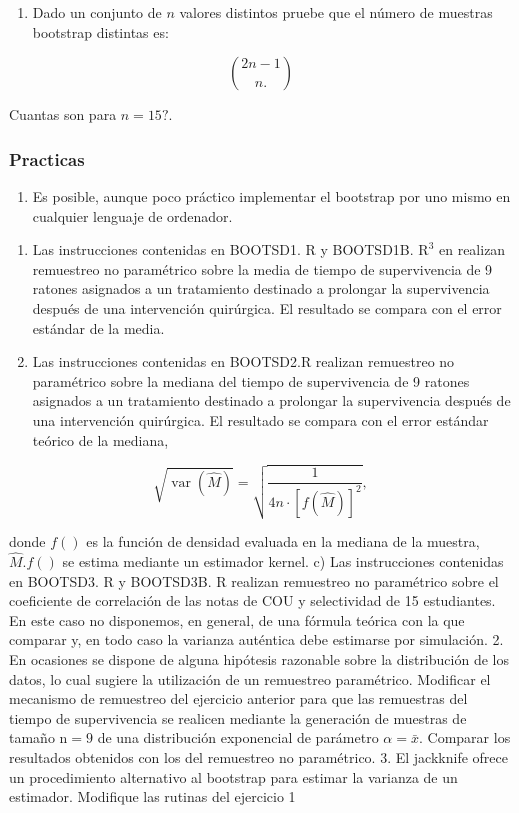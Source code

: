 \documentclass[
]{article}
\providecommand{\tightlist}{%
  \setlength{\itemsep}{0pt}\setlength{\parskip}{0pt}}
\begin{document}
\begin{enumerate}
\def\labelenumi{\arabic{enumi}.}
\setcounter{enumi}{4}
\tightlist
\item
  Dado un conjunto de \(n\) valores distintos pruebe que el número de muestras bootstrap distintas es:
\end{enumerate}

\[
\binom{2 n-1}{n .}
\]

Cuantas son para \(n=15 ?\).

\subsubsection{Practicas}\label{practicas}

\begin{enumerate}
\def\labelenumi{\arabic{enumi}.}
\tightlist
\item
  Es posible, aunque poco práctico implementar el bootstrap por uno mismo en cualquier lenguaje de ordenador.
\end{enumerate}

\begin{enumerate}
\def\labelenumi{\alph{enumi})}
\tightlist
\item
  Las instrucciones contenidas en BOOTSD1. R y BOOTSD1B. \(\mathrm{R}^{3}\) en realizan remuestreo no paramétrico sobre la media de tiempo de supervivencia de 9 ratones asignados a un tratamiento destinado a prolongar la supervivencia después de una intervención quirúrgica. El resultado se compara con el error estándar de la media.
\item
  Las instrucciones contenidas en BOOTSD2.R realizan remuestreo no paramétrico sobre la mediana del tiempo de supervivencia de 9 ratones asignados a un tratamiento destinado a prolongar la supervivencia después de una intervención quirúrgica. El resultado se compara con el error estándar teórico de la mediana,
\end{enumerate}

\[
\sqrt{\operatorname{var}(\widehat{M})}=\sqrt{\frac{1}{4 n \cdot[f(\widehat{M})]^{2}}},
\]

donde \(f()\) es la función de densidad evaluada en la mediana de la muestra, \(\widehat{M} . f()\) se estima mediante un estimador kernel.
c) Las instrucciones contenidas en BOOTSD3. R y BOOTSD3B. R realizan remuestreo no paramétrico sobre el coeficiente de correlación de las notas de COU y selectividad de 15 estudiantes. En este caso no disponemos, en general, de una fórmula teórica con la que comparar y, en todo caso la varianza auténtica debe estimarse por simulación.
2. En ocasiones se dispone de alguna hipótesis razonable sobre la distribución de los datos, lo cual sugiere la utilización de un remuestreo paramétrico. Modificar el mecanismo de remuestreo del ejercicio anterior para que las remuestras del tiempo de supervivencia se realicen mediante la generación de muestras de tamaño \(\mathrm{n}=9\) de una distribución exponencial de parámetro \(\alpha=\bar{x}\). Comparar los resultados obtenidos con los del remuestreo no paramétrico.
3. El jackknife ofrece un procedimiento alternativo al bootstrap para estimar la varianza de un estimador. Modifique las rutinas del ejercicio 1
\end{document}
